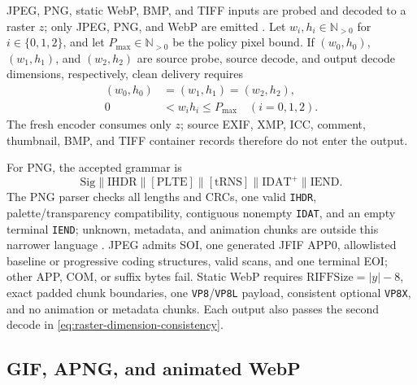 JPEG, PNG, static WebP, BMP, and TIFF inputs are probed and decoded to a raster
\(z\); only JPEG, PNG, and WebP are emitted \cite{ituT81,png3,webpRiff}. Let
\(w_i,h_i\in\mathbb N_{>0}\) for \(i\in\{0,1,2\}\), and let
\(P_{\max}\in\mathbb N_{>0}\) be the policy pixel bound. If
\((w_0,h_0)\), \((w_1,h_1)\), and \((w_2,h_2)\) are source probe, source decode,
and output decode dimensions, respectively, clean delivery requires
\begin{equation}
\begin{aligned}
 (w_0,h_0)&=(w_1,h_1)=(w_2,h_2),\\
 0&<w_i h_i\le P_{\max}\quad(i=0,1,2).
\end{aligned}
 \label{eq:raster-dimension-consistency}
\end{equation}
The fresh encoder consumes only \(z\); source EXIF, XMP, ICC, comment,
thumbnail, BMP, and TIFF container records therefore do not enter the output.

For PNG, the accepted grammar is
\begin{equation}
\mathrm{Sig}\parallel\mathrm{IHDR}\parallel[\mathrm{PLTE}]
\parallel[\mathrm{tRNS}]\parallel\mathrm{IDAT}^{+}
\parallel\mathrm{IEND}.
\label{eq:png-grammar}
\end{equation}
The PNG parser checks all lengths and CRCs, one valid \texttt{IHDR},
palette/transparency compatibility, contiguous nonempty \texttt{IDAT}, and an
empty terminal \texttt{IEND}; unknown, metadata, and animation chunks are
outside this narrower language \cite{png3}. JPEG admits SOI, one generated JFIF
APP0, allowlisted baseline or progressive coding structures, valid scans, and
one terminal EOI; other APP, COM, or suffix bytes fail. Static WebP requires
\(\mathrm{RIFFSize}=|y|-8\), exact padded chunk boundaries, one
\texttt{VP8}/\texttt{VP8L} payload, consistent optional \texttt{VP8X}, and no
animation or metadata chunks. Each output also passes the second decode in
\cref{eq:raster-dimension-consistency}.

\subsection{GIF, APNG, and animated WebP}\label{subsec:animated-raster-method}

